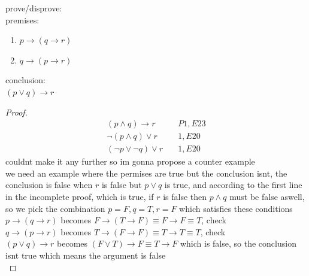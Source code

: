 \documentclass[a4paper,12pt]{article}
\begin{document}
\begin{question}
prove/disprove:\\[0pt]
premises:\\[0pt]
\begin{enumerate}
\item \(p \to (q \to r)\)\\[0pt]
\item \(q \to (p \to r)\)\\[0pt]
\end{enumerate}
conclusion:\\[0pt]
\((p \lor q) \to r\)\\[0pt]
\begin{proof}
\begin{align}
  (p \land q) \to r &\quad P1,E23\\
  \lnot (p \land q) \lor r &\quad 1,E20\\
  (\lnot p \lor \lnot q) \lor r &\quad 1,E20
\end{align}
couldnt make it any further so im gonna propose a counter example\\[0pt]
we need an example where the permises are true but the conclusion isnt, the conclusion is false when \(r\) is false but \(p \lor q\) is true, and according to the first line in the incomplete proof, which is true, if \(r\) is false then \(p \land q\) must be false aswell, so we pick the combination \(p=F,q=T,r=F\) which satisfies these conditions\\[0pt]
\(p \to (q \to r)\) becomes \(F \to (T \to F) \equiv F \to F \equiv T\), check\\[0pt]
\(q \to (p \to r)\) becomes \(T \to (F \to F) \equiv T \to T \equiv T\), check\\[0pt]
\((p \lor q) \to r\) becomes \((F \lor T) \to F \equiv T \to F\) which is false, so the conclusion isnt true which means the argument is false\\[0pt]
\end{proof}
\end{question}
\end{document}
